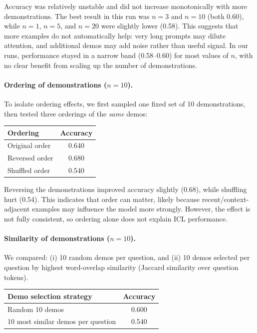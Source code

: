 \documentclass[11pt]{article}
\begin{document}
Accuracy was relatively unstable and did not increase monotonically with more demonstrations.
The best result in this run was $n=3$ and $n=10$ (both 0.60), while $n=1$, $n=5$, and $n=20$ were slightly lower (0.58).
This suggests that more examples do not automatically help: very long prompts may dilute attention, and additional demos may add noise rather than useful signal. In our runs, performance stayed in a narrow band (0.58--0.60) for most values of $n$, with no clear benefit from scaling up the number of demonstrations.

\paragraph{Ordering of demonstrations ($n=10$).}
To isolate ordering effects, we first sampled one fixed set of 10 demonstrations, then tested three orderings of the \emph{same} demos:
\begin{center}
\begin{tabular}{lc}
\hline
Ordering & Accuracy \\
\hline
Original order  & 0.640 \\
Reversed order  & 0.680 \\
Shuffled order  & 0.540 \\
\hline
\end{tabular}
\end{center}

Reversing the demonstrations improved accuracy slightly (0.68), while shuffling hurt (0.54).
This indicates that order can matter, likely because recent/context-adjacent examples may influence the model more strongly.
However, the effect is not fully consistent, so ordering alone does not explain ICL performance.

\paragraph{Similarity of demonstrations ($n=10$).}
We compared:
(i) 10 random demos per question, and
(ii) 10 demos selected per question by highest word-overlap similarity (Jaccard similarity over question tokens).
\begin{center}
\begin{tabular}{lc}
\hline
Demo selection strategy & Accuracy \\
\hline
Random 10 demos                   & 0.600 \\
10 most similar demos per question & 0.540 \\
\hline
\end{tabular}
\end{center}
\end{document}
